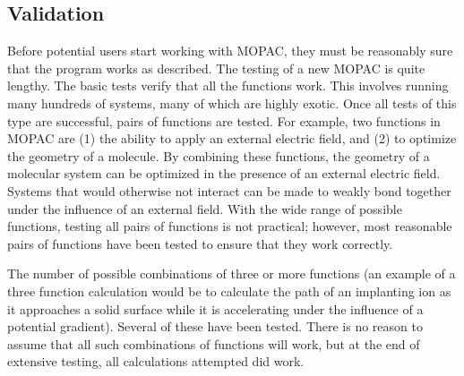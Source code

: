 

\subsection{Validation}
Before potential users start working with MOPAC, they must be reasonably sure
that the program works as described.  The testing of a new MOPAC is quite
lengthy.  The basic tests verify that all the functions work. This involves
running many hundreds of systems, many of which are highly exotic.  Once all
tests of this type are successful, pairs of functions are tested.  For example,
two  functions in MOPAC are (1) the ability to apply an external electric
field, and  (2) to optimize the geometry of a molecule.  By combining these
functions, the  geometry of a molecular system can be optimized in the presence
of an external  electric field.  Systems that would otherwise not interact can
be made to weakly  bond together under the influence of an external field.
With the wide range of  possible functions, testing all pairs of functions is
not practical; however, most  reasonable pairs of functions have been tested to
ensure that they work correctly.

The number of possible combinations of three or more functions (an example of
a three function calculation would be to calculate the path of an implanting
ion  as it approaches a solid surface while it is accelerating under the
influence of a  potential gradient).  Several of these have been tested.  There
is no reason to  assume that all such combinations of functions will work, but
at the end of  extensive testing, all calculations attempted did work.

